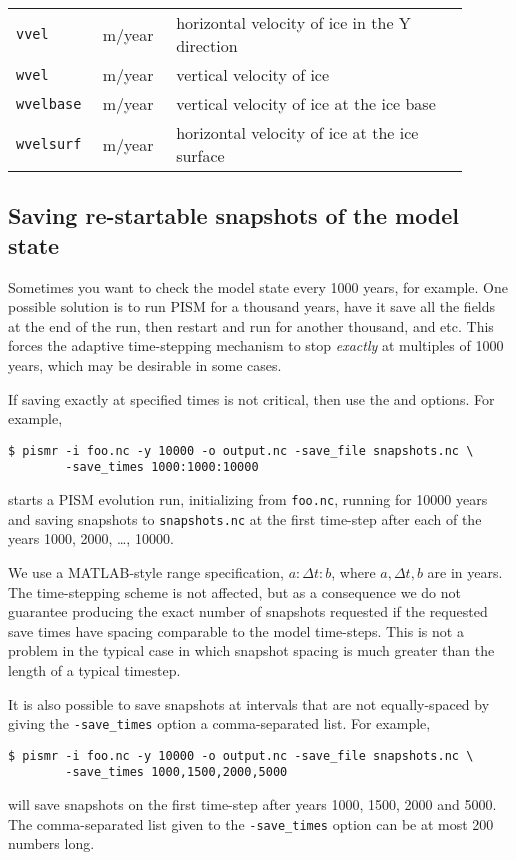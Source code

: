 \begin{table}[ht]
\begin{longtable}{p{0.15\linewidth}p{0.15\linewidth}p{0.6\linewidth}}
    \texttt{vvel} & m/year & horizontal velocity of ice in the Y direction \\
    \texttt{wvel} & m/year & vertical velocity of ice \\
    \texttt{wvelbase} & m/year &vertical velocity of ice at the ice base\\
    \texttt{wvelsurf} & m/year & horizontal velocity of ice at the ice surface\\
    \hline
  \end{longtable}
 \label{tab:extra-vars}
\end{table}

\clearpage

\subsection{Saving re-startable snapshots of the model state}
\label{sec:snapshots}  Sometimes you want to check the model state every 1000 years, for example.  One possible solution is to run PISM for a thousand years, have it save all the fields at the end of the run, then restart and run for another thousand, and etc.  This forces the adaptive time-stepping mechanism to stop \emph{exactly} at multiples of 1000 years, which may be desirable in some cases.

If saving exactly at specified times is not critical, then use the  and  options.  For example,
\begin{verbatim}
$ pismr -i foo.nc -y 10000 -o output.nc -save_file snapshots.nc \
        -save_times 1000:1000:10000
\end{verbatim}
starts a PISM evolution run, initializing from \verb|foo.nc|, running for
10000 years and saving snapshots to \verb|snapshots.nc| at the first time-step
after each of the years 1000, 2000, \dots, 10000.

We use a MATLAB-style range specification, $a:\Delta t:b$, where $a,\Delta t,b$ are in years.  The time-stepping scheme is not affected, but as a consequence we do not guarantee producing the exact number of snapshots requested if the requested save times have spacing comparable to the model time-steps.  This is not a problem in the typical case in which snapshot spacing is much greater than the length of a typical timestep.

It is also possible to save snapshots at intervals that are not equally-spaced
by giving the \verb|-save_times| option a comma-separated list. For example,
\begin{verbatim}
$ pismr -i foo.nc -y 10000 -o output.nc -save_file snapshots.nc \
        -save_times 1000,1500,2000,5000
\end{verbatim}
will save snapshots on the first time-step after years 1000, 1500, 2000 and 5000.
The comma-separated list given to the \verb|-save_times| option can be at most 200 numbers long.

